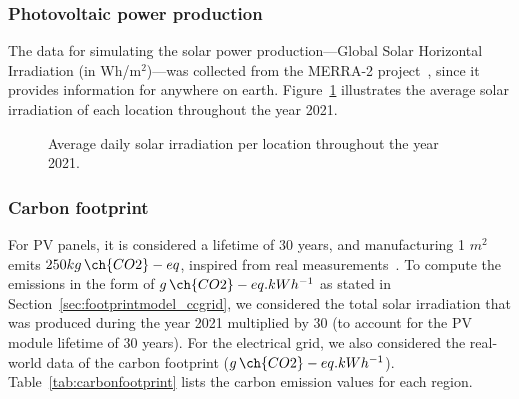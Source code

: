 \subsubsection{Photovoltaic power production}

The data for simulating the solar power production---Global Solar Horizontal Irradiation (in Wh/m$^{2}$)---was collected from the MERRA-2 project~\cite{GELARO2017MERRA2}, since it provides information for anywhere on earth. Figure~\ref{fig:pv_ghi} illustrates the average solar irradiation of each location throughout the year 2021.

 \begin{figure}[h]
  \centering
   {}
  \caption{Average daily solar irradiation per location throughout the year 2021.}
  \label{fig:pv_ghi}
\end{figure}

\subsubsection{Carbon footprint}

For PV panels, it is considered a lifetime of 30 years, and manufacturing 1 $m^2$ emits $250 kg\,\ch{CO2}-eq$, inspired from real measurements~\cite{YUE2014pv_carbon}. To compute the emissions in the form of $g\,\ch{CO2}-eq.kWh^{-1}$ as stated in Section~\ref{sec:footprintmodel_ccgrid}, we considered the total solar irradiation that was produced during the year 2021 multiplied by 30 (to account for the PV module lifetime of 30 years). For the electrical grid, we also considered the real-world data of the carbon footprint ($g\,\ch{CO2}-eq.kWh^{-1}$). Table~\ref{tab:carbonfootprint} lists the carbon emission values for each region.

